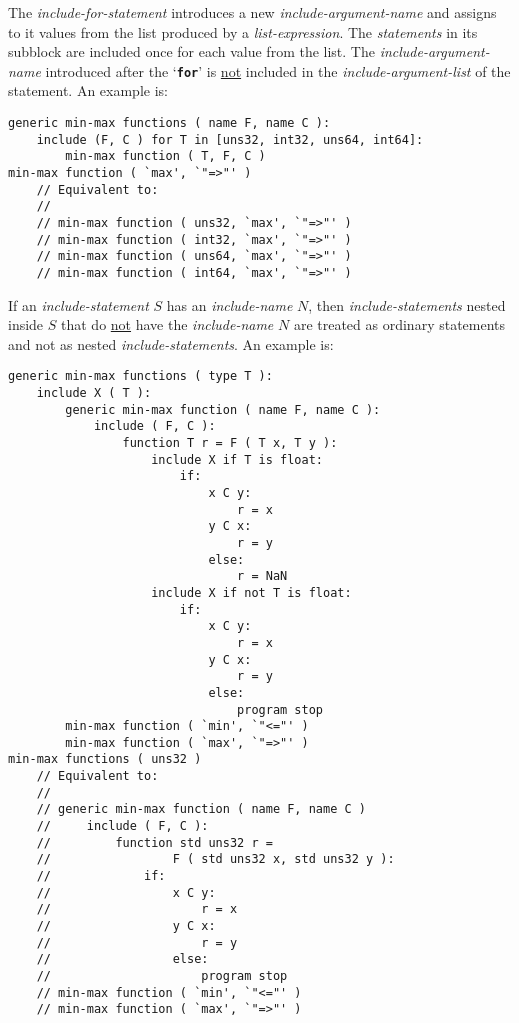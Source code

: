 \documentclass[12pt]{article}
\newcommand{\TT}[1]{{\tt \bfseries #1}}
\newenvironment{indpar}[1][0.3in]%
	{\begin{list}{}%
		     {\setlength{\itemsep}{0in}%
		      \setlength{\topsep}{0in}%
		      \setlength{\parsep}{1ex}%
		      \setlength{\labelwidth}{#1}%
		      \setlength{\leftmargin}{#1}%
		      \addtolength{\leftmargin}{\labelsep}}%
	 \item}%
	{\end{list}}
\begin{document}
The {\em include-for-statement} introduces a new {\em include-argument-name}
and assigns to it values from the list produced by a {\em list-expression}.
The {\em statements} in its subblock are included once for each value
from the list.  The {\em include-argument-name} introduced after the
`\TT{for}' is \underline{not} included in the {\em include-argument-list}
of the statement.  An example is:
\begin{indpar}\begin{verbatim}
generic min-max functions ( name F, name C ):
    include (F, C ) for T in [uns32, int32, uns64, int64]:
        min-max function ( T, F, C )
min-max function ( `max', `"=>"' )
    // Equivalent to:
    //
    // min-max function ( uns32, `max', `"=>"' )
    // min-max function ( int32, `max', `"=>"' )
    // min-max function ( uns64, `max', `"=>"' )
    // min-max function ( int64, `max', `"=>"' )
\end{verbatim}\end{indpar}

If an {\em include-statement} $S$ has an {\em include-name} $N$, then
{\em include-statements} nested inside $S$ that do \underline{not}
have the {\em include-name} $N$ are treated as ordinary statements
and not as nested {\em include-statements}.  An example is:
\begin{indpar}\begin{verbatim}
generic min-max functions ( type T ):
    include X ( T ):
        generic min-max function ( name F, name C ):
            include ( F, C ):
                function T r = F ( T x, T y ):
                    include X if T is float:
                        if:
                            x C y:
                                r = x
                            y C x:
                                r = y
                            else:
                                r = NaN
                    include X if not T is float:
                        if:
                            x C y:
                                r = x
                            y C x:
                                r = y
                            else:
                                program stop
        min-max function ( `min', `"<="' )
        min-max function ( `max', `"=>"' )
min-max functions ( uns32 )
    // Equivalent to:
    //
    // generic min-max function ( name F, name C )
    //     include ( F, C ):
    //         function std uns32 r =
    //                 F ( std uns32 x, std uns32 y ):
    //             if:
    //                 x C y:
    //                     r = x
    //                 y C x:
    //                     r = y
    //                 else:
    //                     program stop
    // min-max function ( `min', `"<="' )
    // min-max function ( `max', `"=>"' )
\end{verbatim}\end{indpar}
\end{document}

